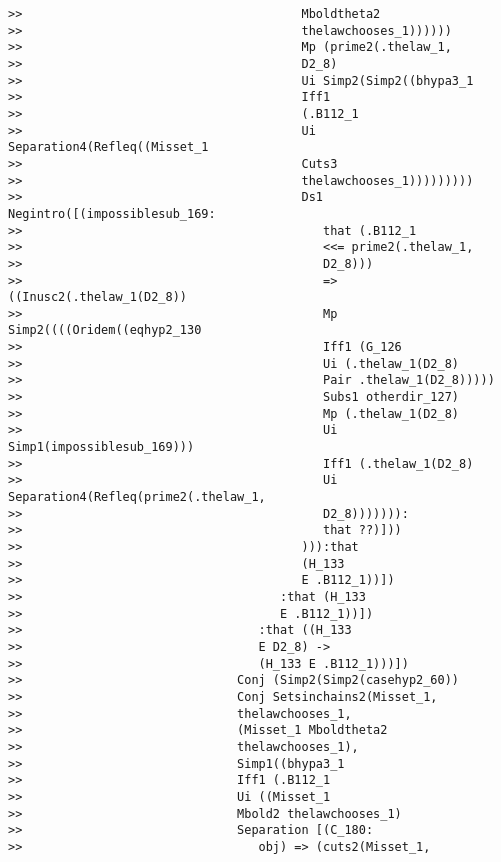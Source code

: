 \documentclass[12pt]{article}
\begin{document}
\begin{verbatim}
>>                                       Mboldtheta2
>>                                       thelawchooses_1))))))
>>                                       Mp (prime2(.thelaw_1,
>>                                       D2_8)
>>                                       Ui Simp2(Simp2((bhypa3_1
>>                                       Iff1
>>                                       (.B112_1
>>                                       Ui Separation4(Refleq((Misset_1
>>                                       Cuts3
>>                                       thelawchooses_1)))))))))
>>                                       Ds1 Negintro([(impossiblesub_169:
>>                                          that (.B112_1
>>                                          <<= prime2(.thelaw_1,
>>                                          D2_8)))
>>                                          => ((Inusc2(.thelaw_1(D2_8))
>>                                          Mp Simp2((((Oridem((eqhyp2_130
>>                                          Iff1 (G_126
>>                                          Ui (.thelaw_1(D2_8)
>>                                          Pair .thelaw_1(D2_8)))))
>>                                          Subs1 otherdir_127)
>>                                          Mp (.thelaw_1(D2_8)
>>                                          Ui Simp1(impossiblesub_169)))
>>                                          Iff1 (.thelaw_1(D2_8)
>>                                          Ui Separation4(Refleq(prime2(.thelaw_1,
>>                                          D2_8))))))):
>>                                          that ??)]))
>>                                       ))):that
>>                                       (H_133
>>                                       E .B112_1))])
>>                                    :that (H_133
>>                                    E .B112_1))])
>>                                 :that ((H_133
>>                                 E D2_8) ->
>>                                 (H_133 E .B112_1)))])
>>                              Conj (Simp2(Simp2(casehyp2_60))
>>                              Conj Setsinchains2(Misset_1,
>>                              thelawchooses_1,
>>                              (Misset_1 Mboldtheta2
>>                              thelawchooses_1),
>>                              Simp1((bhypa3_1
>>                              Iff1 (.B112_1
>>                              Ui ((Misset_1
>>                              Mbold2 thelawchooses_1)
>>                              Separation [(C_180:
>>                                 obj) => (cuts2(Misset_1,

\end{verbatim}
\end{document}
